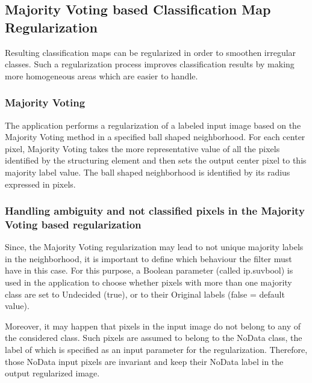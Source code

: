 \subsection{Majority Voting based Classification Map Regularization}\label{ssec:classificationmapregularization}

Resulting classification maps can be regularized in order to smoothen irregular classes. Such a regularization process
improves classification results by making more homogeneous areas which are easier to handle.

\subsubsection{Majority Voting}

The  application performs a regularization of a labeled input image
based on the Majority Voting method in a specified ball shaped neighborhood. For each center pixel, Majority Voting takes the
more representative value of all the pixels identified by the structuring element and then sets the output center pixel
to this majority label value. The ball shaped neighborhood is identified by its radius expressed in pixels.


\subsubsection{Handling ambiguity and not classified pixels in the Majority Voting based regularization}

Since, the Majority Voting regularization may lead to not unique majority labels in the neighborhood, it is important to define
which behaviour the filter must have in this case. For this purpose, a Boolean parameter (called ip.suvbool) is used in the
 application to choose whether pixels with more than one majority class are set to
Undecided (true), or to their Original labels (false = default value).

Moreover, it may happen that pixels in the input image do not belong to any of the considered class. Such pixels are
assumed to belong to the NoData class, the label of which is specified as an input parameter for the regularization. Therefore,
those NoData input pixels are invariant and keep their NoData label in the output regularized image.
 

